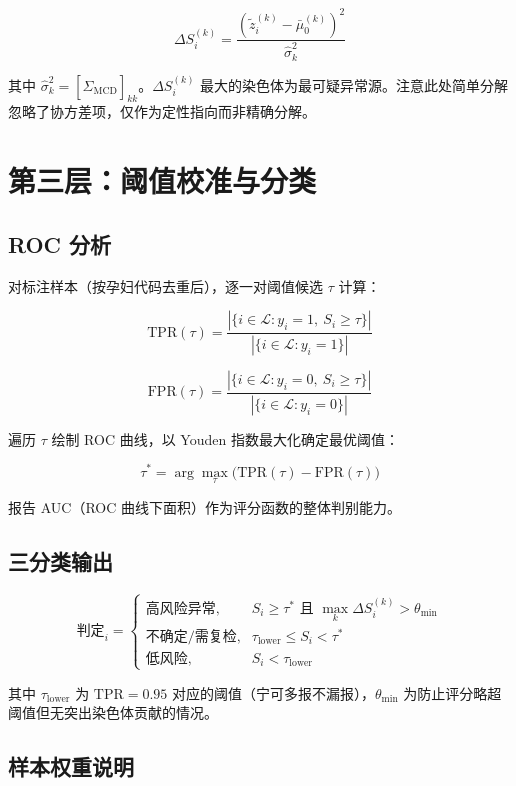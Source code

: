 \documentclass[UTF8]{ctexart}
\begin{document}
\[
\Delta S_i^{(k)} = \frac{(\tilde{z}_i^{(k)} - \bar{\mu}_0^{(k)})^2}{\hat{\sigma}_k^2}
\]

其中 $\hat{\sigma}_k^2 = [\hat{\Sigma}_{\text{MCD}}]_{kk}$。$\Delta S_i^{(k)}$ 最大的染色体为最可疑异常源。注意此处简单分解忽略了协方差项，仅作为定性指向而非精确分解。

\section{第三层：阈值校准与分类}

\subsection{ROC 分析}

对标注样本（按孕妇代码去重后），逐一对阈值候选 $\tau$ 计算：

\[
\text{TPR}(\tau) = \frac{|\{i \in \mathcal{L}: y_i = 1,\ S_i \geq \tau\}|}{|\{i \in \mathcal{L}: y_i = 1\}|}
\]

\[
\text{FPR}(\tau) = \frac{|\{i \in \mathcal{L}: y_i = 0,\ S_i \geq \tau\}|}{|\{i \in \mathcal{L}: y_i = 0\}|}
\]

遍历 $\tau$ 绘制 ROC 曲线，以 Youden 指数最大化确定最优阈值：

\[
\tau^* = \arg\max_{\tau} \big( \text{TPR}(\tau) - \text{FPR}(\tau) \big)
\]

报告 AUC（ROC 曲线下面积）作为评分函数的整体判别能力。

\subsection{三分类输出}

\[
\text{判定}_i = \begin{cases}
\text{高风险异常}, & S_i \geq \tau^* \text{ 且 } \max_k \Delta S_i^{(k)} > \theta_{\text{min}} \\[4pt]
\text{不确定/需复检}, & \tau_{\text{lower}} \leq S_i < \tau^* \\[4pt]
\text{低风险}, & S_i < \tau_{\text{lower}}
\end{cases}
\]

其中 $\tau_{\text{lower}}$ 为 $\text{TPR}=0.95$ 对应的阈值（宁可多报不漏报），$\theta_{\text{min}}$ 为防止评分略超阈值但无突出染色体贡献的情况。

\subsection{样本权重说明}
\end{document}
